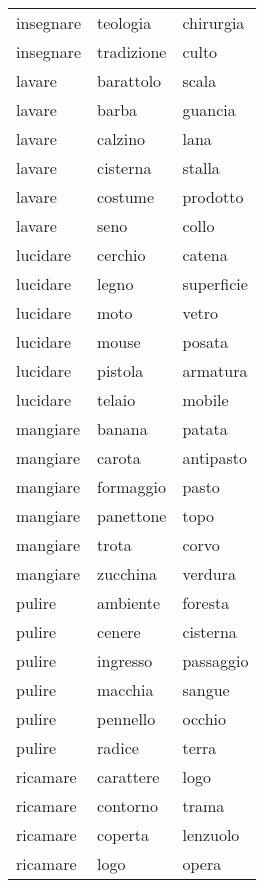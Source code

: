 \begin{longtable}{l|ll}
insegnare      & teologia      & chirurgia    \\
insegnare      & tradizione    & culto        \\
lavare         & barattolo     & scala        \\
lavare         & barba         & guancia      \\
lavare         & calzino       & lana         \\
lavare         & cisterna      & stalla       \\
lavare         & costume       & prodotto     \\
lavare         & seno          & collo        \\
lucidare       & cerchio       & catena       \\
lucidare       & legno         & superficie   \\
lucidare       & moto          & vetro        \\
lucidare       & mouse         & posata       \\
lucidare       & pistola       & armatura     \\
lucidare       & telaio        & mobile       \\
mangiare       & banana        & patata       \\
mangiare       & carota        & antipasto    \\
mangiare       & formaggio     & pasto        \\
mangiare       & panettone     & topo         \\
mangiare       & trota         & corvo        \\
mangiare       & zucchina      & verdura      \\
pulire         & ambiente      & foresta      \\
pulire         & cenere        & cisterna     \\
pulire         & ingresso      & passaggio    \\
pulire         & macchia       & sangue       \\
pulire         & pennello      & occhio       \\
pulire         & radice        & terra        \\
ricamare       & carattere     & logo         \\
ricamare       & contorno      & trama        \\
ricamare       & coperta       & lenzuolo     \\
ricamare       & logo          & opera        \\

\end{longtable}

